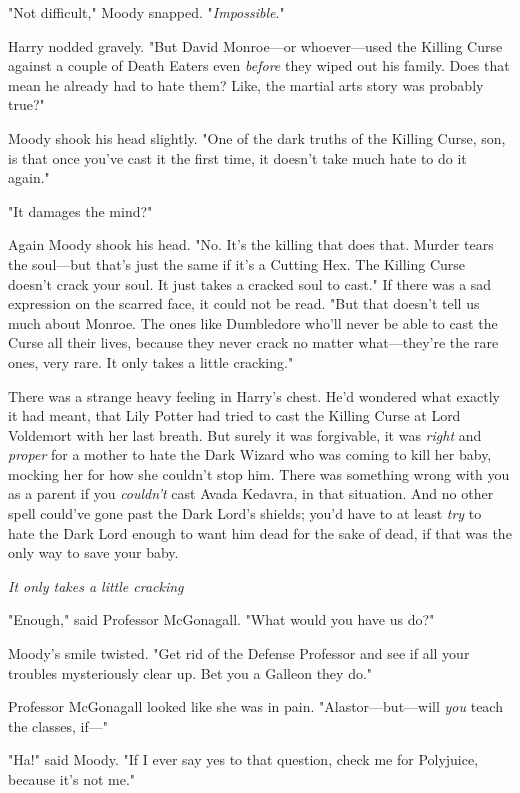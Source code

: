"Not difficult," Moody snapped. "\emph{Impossible}."

Harry nodded gravely. "But David Monroe---or whoever---used the Killing Curse
against a couple of Death Eaters even \emph{before} they wiped out his family.
Does that mean he already had to hate them? Like, the martial arts story was
probably true?"

Moody shook his head slightly. "One of the dark truths of the Killing Curse,
son, is that once you've cast it the first time, it doesn't take much hate to
do it again."

"It damages the mind?"

Again Moody shook his head. "No. It's the killing that does that. Murder tears
the soul---but that's just the same if it's a Cutting Hex. The Killing Curse
doesn't crack your soul. It just takes a cracked soul to cast." If there was a
sad expression on the scarred face, it could not be read. "But that doesn't
tell us much about Monroe. The ones like Dumbledore who'll never be able to
cast the Curse all their lives, because they never crack no matter
what---they're the rare ones, very rare. It only takes a little cracking."

There was a strange heavy feeling in Harry's chest. He'd wondered what exactly
it had meant, that Lily Potter had tried to cast the Killing Curse at Lord
Voldemort with her last breath. But surely it was forgivable, it was
\emph{right} and \emph{proper} for a mother to hate the Dark Wizard who was
coming to kill her baby, mocking her for how she couldn't stop him. There was
something wrong with you as a parent if you \emph{couldn't} cast Avada Kedavra,
in that situation. And no other spell could've gone past the Dark Lord's
shields; you'd have to at least \emph{try} to hate the Dark Lord enough to want
him dead for the sake of dead, if that was the only way to save your baby.

\emph{It only takes a little cracking{\el}}

"Enough," said Professor McGonagall. "What would you have us do?"

Moody's smile twisted. "Get rid of the Defense Professor and see if all your
troubles mysteriously clear up. Bet you a Galleon they do."

Professor McGonagall looked like she was in pain. "Alastor---but---will
\emph{you} teach the classes, if\mbox{---}"

"Ha!" said Moody. "If I ever say yes to that question, check me for Polyjuice,
because it's not me."

